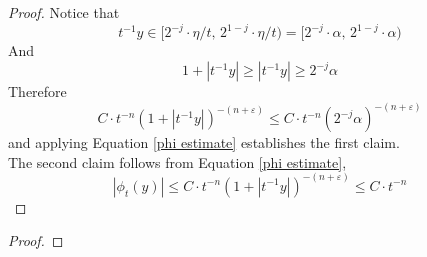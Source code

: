 \documentclass[../../main.tex]{subfiles}
\begin{document}
\begin{proof}
    Notice that\[t^{-1}y\in[2^{-j}\cdot \eta/t,\,2^{1-j}\cdot \eta/t)=[2^{-j}\cdot \alpha,\,2^{1-j}\cdot \alpha)\]
    And\[1+|t^{-1}y|\geq |t^{-1}y|\geq 2^{-j}\alpha\]
    Therefore\[C\cdot t^{-n}(1+|t^{-1}y|)^{-(n+\varepsilon)}\leq C\cdot t^{-n}(2^{-j}\alpha)^{-(n+\varepsilon)}\]
    and applying Equation \eqref{phi estimate} establishes the first claim.\\

    The second claim follows from Equation \eqref{phi estimate}, \[|\phi_t(y)|\leq C\cdot t^{-n}(1+|t^{-1}y|)^{-(n+\varepsilon)}\leq C\cdot t^{-n}\]
\end{proof}

\begin{lemma}
    
\end{lemma}

\begin{proof}
\end{proof}
\end{document}
